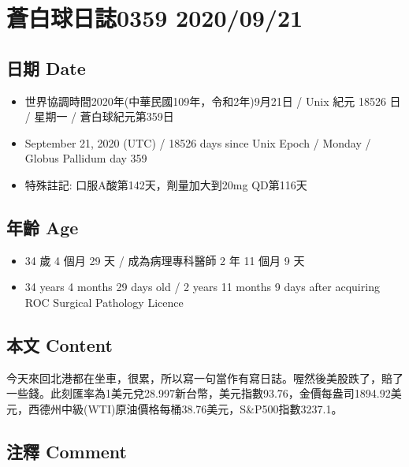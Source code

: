\documentclass[
]{article}
\providecommand{\tightlist}{%
  \setlength{\itemsep}{0pt}\setlength{\parskip}{0pt}}
\begin{document}
\hypertarget{ux84bcux767dux7403ux65e5ux8a8c0359-20200921}{%
\section{蒼白球日誌0359
2020/09/21}\label{ux84bcux767dux7403ux65e5ux8a8c0359-20200921}}

\hypertarget{ux65e5ux671f-date-20}{%
\subsection{日期 Date}\label{ux65e5ux671f-date-20}}

\begin{itemize}
\tightlist
\item
  世界協調時間2020年(中華民國109年，令和2年)9月21日 / Unix 紀元 18526 日
  / 星期一 / 蒼白球紀元第359日
\item
  September 21, 2020 (UTC) / 18526 days since Unix Epoch / Monday /
  Globus Pallidum day 359
\item
  特殊註記: 口服A酸第142天，劑量加大到20mg QD第116天
\end{itemize}

\hypertarget{ux5e74ux9f61-age-20}{%
\subsection{年齡 Age}\label{ux5e74ux9f61-age-20}}

\begin{itemize}
\tightlist
\item
  34 歲 4 個月 29 天 / 成為病理專科醫師 2 年 11 個月 9 天
\item
  34 years 4 months 29 days old / 2 years 11 months 9 days after
  acquiring ROC Surgical Pathology Licence
\end{itemize}

\hypertarget{ux672cux6587-content-20}{%
\subsection{本文 Content}\label{ux672cux6587-content-20}}

今天來回北港都在坐車，很累，所以寫一句當作有寫日誌。喔然後美股跌了，賠了一些錢。此刻匯率為1美元兌28.997新台幣，美元指數93.76，金價每盎司1894.92美元，西德州中級(WTI)原油價格每桶38.76美元，S\&P500指數3237.1。

\hypertarget{ux6ce8ux91cb-comment-20}{%
\subsection{注釋 Comment}\label{ux6ce8ux91cb-comment-20}}
\end{document}
